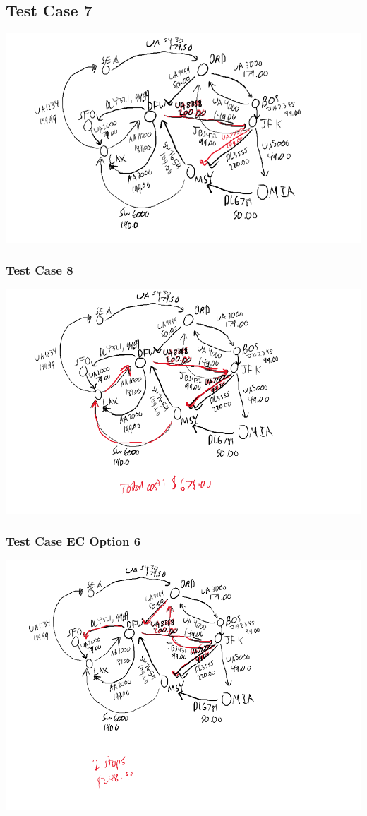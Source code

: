 \documentclass[titlepage]{article}
\begin{document}
\subsection{Test Case 7}
\includegraphics[scale=0.4]{testCase6.png}
\subsubsection{Test Case 8}
\includegraphics[scale=0.4]{testCase7.png}
\subsubsection{Test Case EC Option 6}
\includegraphics[scale=0.4]{testCase8.png}
\end{document}
